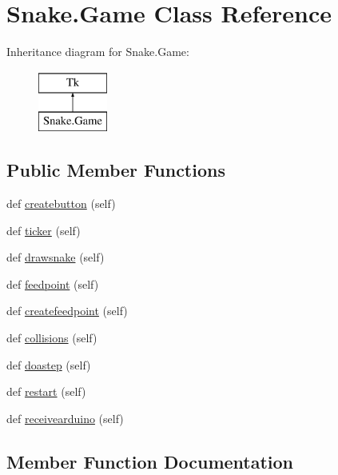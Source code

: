 \hypertarget{class_snake_1_1_game}{}\section{Snake.\+Game Class Reference}
\label{class_snake_1_1_game}
Inheritance diagram for Snake.\+Game\+:\begin{figure}[H]
\begin{center}
\leavevmode
\includegraphics[height=2.000000cm]{class_snake_1_1_game}
\end{center}
\end{figure}
\subsection*{Public Member Functions}
\begin{DoxyCompactItemize}
\item 
def \mbox{\hyperlink{class_snake_1_1_game_aedca2341f309daf9d1fdd1c1b5fbbb74}{createbutton}} (self)
\item 
def \mbox{\hyperlink{class_snake_1_1_game_a7b60758212d640631d9fdb6d4f7af472}{ticker}} (self)
\item 
def \mbox{\hyperlink{class_snake_1_1_game_aee9e8a04fb8c7d56f3b3230fa4d8a66b}{drawsnake}} (self)
\item 
def \mbox{\hyperlink{class_snake_1_1_game_a98cef3415a4d544424cd9bc57e348ab7}{feedpoint}} (self)
\item 
def \mbox{\hyperlink{class_snake_1_1_game_a47967ef289465a984d6c86b34ead527e}{createfeedpoint}} (self)
\item 
def \mbox{\hyperlink{class_snake_1_1_game_a280b6182e187f4b13756abbc8776bfc0}{collisions}} (self)
\item 
def \mbox{\hyperlink{class_snake_1_1_game_a30c722d4cdac2ba08f691a89a31e3306}{doastep}} (self)
\item 
def \mbox{\hyperlink{class_snake_1_1_game_a5cdcfd6cdea9949bfe5005cb602c68d4}{restart}} (self)
\item 
def \mbox{\hyperlink{class_snake_1_1_game_aebc0cbe1082bdba9f171f075ad8f6693}{receivearduino}} (self)
\end{DoxyCompactItemize}


\subsection{Member Function Documentation}
\mbox{\label{class_snake_1_1_game_a280b6182e187f4b13756abbc8776bfc0}} 

